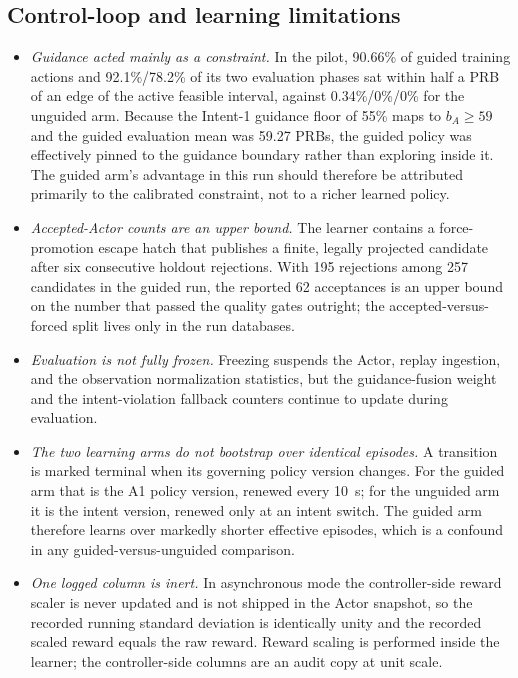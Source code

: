 \subsection{Control-loop and learning limitations}
\begin{itemize}
  \item \emph{Guidance acted mainly as a constraint.} In the pilot, 90.66\% of guided training actions and 92.1\%/78.2\% of its two evaluation phases sat within half a PRB of an edge of the active feasible interval, against 0.34\%/0\%/0\% for the unguided arm. Because the Intent-1 guidance floor of 55\% maps to $b_A\geq 59$ and the guided evaluation mean was 59.27 PRBs, the guided policy was effectively pinned to the guidance boundary rather than exploring inside it. The guided arm's advantage in this run should therefore be attributed primarily to the calibrated constraint, not to a richer learned policy.
  \item \emph{Accepted-Actor counts are an upper bound.} The learner contains a force-promotion escape hatch that publishes a finite, legally projected candidate after six consecutive holdout rejections. With 195 rejections among 257 candidates in the guided run, the reported 62 acceptances is an upper bound on the number that passed the quality gates outright; the accepted-versus-forced split lives only in the run databases.
  \item \emph{Evaluation is not fully frozen.} Freezing suspends the Actor, replay ingestion, and the observation normalization statistics, but the guidance-fusion weight and the intent-violation fallback counters continue to update during evaluation.
  \item \emph{The two learning arms do not bootstrap over identical episodes.} A transition is marked terminal when its governing policy version changes. For the guided arm that is the A1 policy version, renewed every 10~s; for the unguided arm it is the intent version, renewed only at an intent switch. The guided arm therefore learns over markedly shorter effective episodes, which is a confound in any guided-versus-unguided comparison.
  \item \emph{One logged column is inert.} In asynchronous mode the controller-side reward scaler is never updated and is not shipped in the Actor snapshot, so the recorded running standard deviation is identically unity and the recorded scaled reward equals the raw reward. Reward scaling is performed inside the learner; the controller-side columns are an audit copy at unit scale.
\end{itemize}

